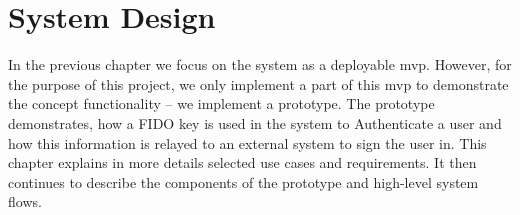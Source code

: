 \section{System Design}

In the previous chapter we focus on the system as a deployable \acrlong{mvp}. However, for the purpose of this project, we only implement a part of this \acrshort{mvp} to demonstrate the concept functionality -- we implement a prototype. The prototype demonstrates, how a FIDO key is used in the system to Authenticate a user and how this information is relayed to an external system to sign the user in. This chapter explains in more details selected use cases and requirements. It then continues to describe the components of the prototype and high-level system flows.







